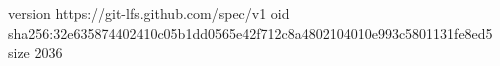 version https://git-lfs.github.com/spec/v1
oid sha256:32e635874402410c05b1dd0565e42f712c8a4802104010e993c5801131fe8ed5
size 2036
